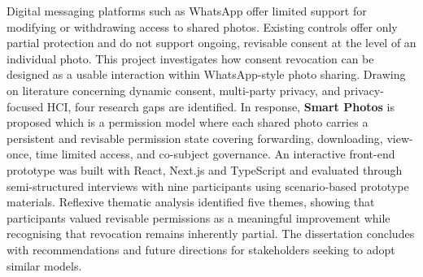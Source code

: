 Digital messaging platforms such as WhatsApp offer limited support for modifying or withdrawing access to shared photos. Existing controls offer only partial protection and do not support ongoing, revisable consent at the level of an individual photo. This project investigates how consent revocation can be designed as a usable interaction within WhatsApp-style photo sharing. Drawing on literature concerning dynamic consent, multi-party privacy, and privacy-focused HCI, four research gaps are identified. In response, \textbf{Smart Photos} is proposed which is a permission model where each shared photo carries a persistent and revisable permission state covering forwarding, downloading, view-once, time limited access, and co-subject governance. An interactive front-end prototype was built with React, Next.js and TypeScript and evaluated through semi-structured interviews with nine participants using scenario-based prototype materials. Reflexive thematic analysis identified five themes, showing that participants valued revisable permissions as a meaningful improvement while recognising that revocation remains inherently partial. The dissertation concludes with recommendations and future directions for stakeholders seeking to adopt similar models.
